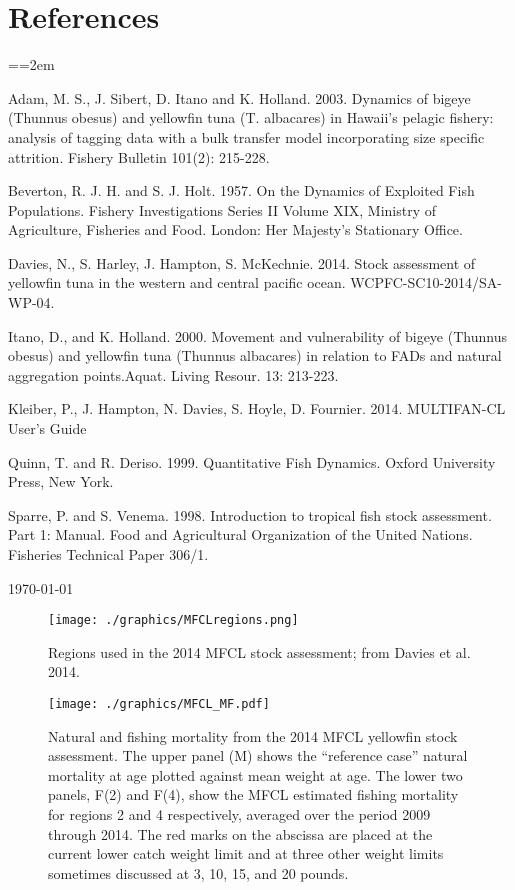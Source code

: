 \documentclass[12pt,letterpaper,twoside]{article}
\begin{document}
\section*{References}
{\parindent=0cm \small
\everypar={\hangindent=2em }\par
Adam, M. S., J. Sibert, D. Itano and K. Holland. 2003. Dynamics of
bigeye (Thunnus obesus) and yellowfin tuna (T. albacares) in Hawaii's
pelagic fishery: analysis of tagging data with a bulk transfer model
incorporating size specific attrition. Fishery Bulletin 101(2):
215-228.

Beverton, R. J. H. and S. J. Holt. 1957. On the Dynamics of Exploited
Fish Populations. Fishery Investigations Series II Volume XIX,
Ministry of Agriculture, Fisheries and Food. London: Her Majesty's
Stationary Office.

Davies, N., S. Harley, J. Hampton, S. McKechnie. 2014. Stock
assessment of yellowfin tuna in the western and central pacific ocean.
WCPFC-SC10-2014/SA-WP-04.

Itano, D., and K. Holland. 2000.  Movement and vulnerability of bigeye
(Thunnus obesus) and yellowfin tuna (Thunnus albacares) in relation to
FADs and natural aggregation points.Aquat. Living Resour. 13: 213-223.

Kleiber, P., J. Hampton, N. Davies, S. Hoyle, D. Fournier. 2014.
MULTIFAN-CL User’s Guide

Quinn, T. and R. Deriso. 1999. Quantitative Fish Dynamics. Oxford
University Press, New York.

Sparre, P. and S. Venema. 1998. Introduction to tropical fish stock
assessment. Part 1: Manual. Food and Agricultural Organization of the
United Nations. Fisheries Technical Paper 306/1.
\par}
\vfill
\today
\clearpage

\begin{figure}
\begin{center}
\texttt{[image: ./graphics/MFCLregions.png]}
\caption{\label{fig:mfclreg}
Regions used in the 2014 MFCL stock assessment; from Davies et al.
2014.
}
\end{center}
\end{figure}

\begin{figure}
\begin{center}
\texttt{[image: ./graphics/MFCL\_MF.pdf]}
\caption{\label{fig:mfclmf}
Natural and fishing mortality from the 2014 MFCL yellowfin stock
assessment. The upper panel (M) shows the ``reference case'' natural
mortality at age plotted against mean weight at age.
The lower two panels, F(2) and F(4), show the MFCL estimated fishing
mortality for regions 2 and 4 respectively, averaged over the period
2009 through 2014.
The red marks on the abscissa are placed at
the current lower catch weight limit and at three other
weight limits sometimes discussed
at 3, 10, 15, and 20 pounds.
}
\end{center}
\end{figure}
\end{document}
